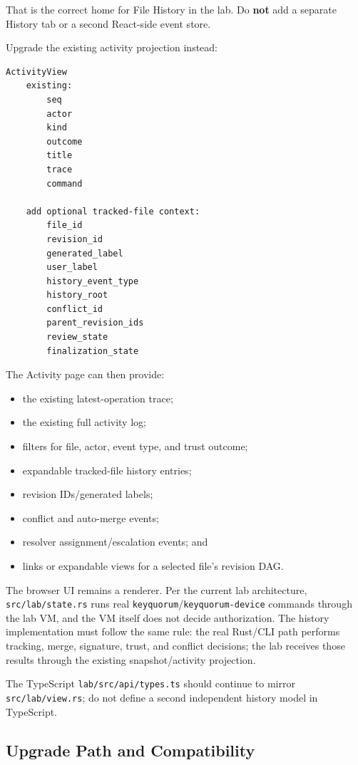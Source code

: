 \documentclass[11pt]{article}
\begin{document}
That is the correct home for File History in the lab. Do \textbf{not} add a separate History tab or a second React-side event store.

Upgrade the existing activity projection instead:

\begin{lstlisting}
ActivityView
    existing:
        seq
        actor
        kind
        outcome
        title
        trace
        command

    add optional tracked-file context:
        file_id
        revision_id
        generated_label
        user_label
        history_event_type
        history_root
        conflict_id
        parent_revision_ids
        review_state
        finalization_state
\end{lstlisting}

The Activity page can then provide:

\begin{itemize}[leftmargin=1.5em]
  \item the existing latest-operation trace;
  \item the existing full activity log;
  \item filters for file, actor, event type, and trust outcome;
  \item expandable tracked-file history entries;
  \item revision IDs/generated labels;
  \item conflict and auto-merge events;
  \item resolver assignment/escalation events; and
  \item links or expandable views for a selected file's revision DAG.
\end{itemize}

The browser UI remains a renderer. Per the current lab architecture, \texttt{src/lab/state.rs} runs real \texttt{keyquorum}/\texttt{keyquorum-device} commands through the lab VM, and the VM itself does not decide authorization. The history implementation must follow the same rule: the real Rust/CLI path performs tracking, merge, signature, trust, and conflict decisions; the lab receives those results through the existing snapshot/activity projection.

The TypeScript \texttt{lab/src/api/types.ts} should continue to mirror \texttt{src/lab/view.rs}; do not define a second independent history model in TypeScript.

\subsection{Upgrade Path and Compatibility}
\end{document}
